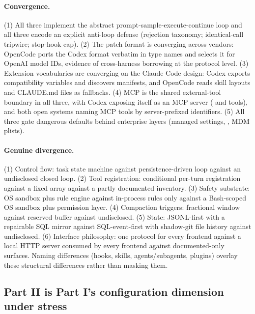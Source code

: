 \documentclass{article}
\newcommand{\codex}[0]{Codex}
\newcommand{\occ}[0]{OpenCode}
\newcommand{\ccc}[0]{Claude Code}
\begin{document}
\paragraph{Convergence.} (1) All three implement the abstract
prompt-sample-execute-continue loop and all three encode an explicit
anti-loop defense (rejection taxonomy; identical-call tripwire; stop-hook
cap). (2) The patch format is converging across vendors: \occ{} ports the
\codex{}  format verbatim in type names and selects it
for OpenAI model IDs, evidence of cross-harness borrowing at the protocol
level. (3) Extension vocabularies are converging on the \ccc{} design:
\codex{} exports  compatibility variables and
discovers  manifests, and \occ{} reads 
skill layouts and CLAUDE.md files as fallbacks. (4) MCP is the shared
external-tool boundary in all three, with \codex{} exposing itself as an
MCP server ( and  tools), and both open
systems naming MCP tools by server-prefixed identifiers. (5) All three
gate dangerous defaults behind enterprise layers (managed settings,
, MDM plists).

\paragraph{Genuine divergence.} (1) Control flow: task state machine
against persistence-driven loop against an undisclosed closed loop.
(2) Tool registration: conditional per-turn registration against a fixed
array against a partly documented inventory. (3) Safety substrate: OS
sandbox plus rule engine against in-process rules only against a Bash-scoped
OS sandbox plus permission layer. (4) Compaction triggers: fractional
window against reserved buffer against undisclosed. (5) State: JSONL-first
with a repairable SQL mirror against SQL-event-first with shadow-git file
history against undisclosed. (6) Interface philosophy: one protocol for
every frontend against a local HTTP server consumed by every frontend
against documented-only surfaces. Naming differences (hooks, skills,
agents/subagents, plugins) overlay these structural differences rather than
masking them.

\subsection{Part II is Part I's configuration dimension under stress}
\label{sec:crossreading}
\end{document}
